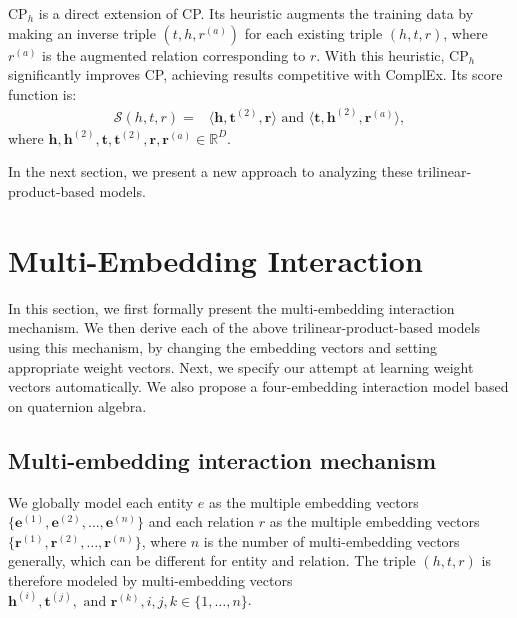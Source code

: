 \documentclass[sigconf,edbt]{acmart-edbt2019}
\def\ve{{\bm{e}}}
\def\vh{{\bm{h}}}
\def\vr{{\bm{r}}}
\def\vt{{\bm{t}}}
\def\gS{{\mathcal{S}}}
\def\sR{{\mathbb{R}}}
\begin{document}
CP$ _h $ \cite{lacroix_canonicaltensordecomposition_2018} is a direct extension of CP. Its heuristic augments the training data by making an inverse triple $ (t, h, r^{(a)}) $ for each existing triple $ (h, t, r) $, where $ r^{(a)} $ is the augmented relation corresponding to $ r $. With this heuristic, CP$ _h $ significantly improves CP, achieving results competitive with ComplEx. Its score function is:
\begin{equation} \label{eq:cph}
\begin{split}
\gS(h,t,r) = &\langle \vh, \vt^{(2)}, \vr \rangle \text{ and } \langle \vt, \vh^{(2)}, \vr^{(a)} \rangle,
\end{split}
\end{equation}
where $ \vh, \vh^{(2)}, \vt, \vt^{(2)}, \vr, \vr^{(a)} \in \sR^{D} $.

In the next section, we present a new approach to analyzing these trilinear-product-based models.

\section{Multi-Embedding Interaction} \label{sect:method}
In this section, we first formally present the multi-embedding interaction mechanism. We then derive each of the above trilinear-product-based models using this mechanism, by changing the embedding vectors and setting appropriate weight vectors. Next, we specify our attempt at learning weight vectors automatically. We also propose a four-embedding interaction model based on quaternion algebra.

\subsection{Multi-embedding interaction mechanism}
We globally model each entity $ e $ as the multiple embedding vectors $ \{\ve^{(1)}, \ve^{(2)}, \dots, \ve^{(n)}\} $ and each relation $ r $ as the multiple embedding vectors $ \{\vr^{(1)}, \vr^{(2)}, \dots, \vr^{(n)}\} $, where $ n $ is the number of multi-embedding vectors generally, which can be different for entity and relation. The triple $ (h, t, r) $ is therefore modeled by multi-embedding vectors $ \vh^{(i)}, \vt^{(j)}, \text{ and } \vr^{(k)}, i, j, k \in \{1, \dots, n\} $.
\end{document}
